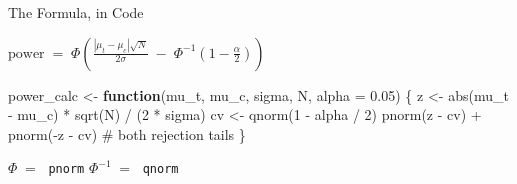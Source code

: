 \documentclass[
  ignorenonframetext,
  aspectratio=169,
]{beamer}
\newenvironment{Shaded}{\begin{snugshade}}{\end{snugshade}}
\newcommand{\AttributeTok}[1]{\textcolor[rgb]{0.40,0.45,0.13}{#1}}
\newcommand{\CommentTok}[1]{\textcolor[rgb]{0.37,0.37,0.37}{#1}}
\newcommand{\ControlFlowTok}[1]{\textcolor[rgb]{0.00,0.23,0.31}{\textbf{#1}}}
\newcommand{\DecValTok}[1]{\textcolor[rgb]{0.68,0.00,0.00}{#1}}
\newcommand{\FloatTok}[1]{\textcolor[rgb]{0.68,0.00,0.00}{#1}}
\newcommand{\FunctionTok}[1]{\textcolor[rgb]{0.28,0.35,0.67}{#1}}
\newcommand{\NormalTok}[1]{\textcolor[rgb]{0.00,0.23,0.31}{#1}}
\newcommand{\OtherTok}[1]{\textcolor[rgb]{0.00,0.23,0.31}{#1}}
\newcommand{\SpecialCharTok}[1]{\textcolor[rgb]{0.37,0.37,0.37}{#1}}
\begin{document}
\begin{frame}[fragile]{The Formula, in Code}
\label{the-formula-in-code}
\vspace{0.6em}

\begin{center}
$\displaystyle \text{power} \;=\; \Phi\!\left( \frac{|\mu_t - \mu_c|\sqrt{N}}{2\sigma} \;-\; \Phi^{-1}\!\left(1-\frac{\alpha}{2}\right) \right)$
\end{center}

\vspace{0.9em}

\begin{Shaded}
\begin{Highlighting}[]
\NormalTok{power\_calc }\OtherTok{\textless{}{-}} \ControlFlowTok{function}\NormalTok{(mu\_t, mu\_c, sigma, N, }\AttributeTok{alpha =} \FloatTok{0.05}\NormalTok{) \{}
\NormalTok{  z }\OtherTok{\textless{}{-}} \FunctionTok{abs}\NormalTok{(mu\_t }\SpecialCharTok{{-}}\NormalTok{ mu\_c) }\SpecialCharTok{*} \FunctionTok{sqrt}\NormalTok{(N) }\SpecialCharTok{/}\NormalTok{ (}\DecValTok{2} \SpecialCharTok{*}\NormalTok{ sigma)}
\NormalTok{  cv }\OtherTok{\textless{}{-}} \FunctionTok{qnorm}\NormalTok{(}\DecValTok{1} \SpecialCharTok{{-}}\NormalTok{ alpha }\SpecialCharTok{/} \DecValTok{2}\NormalTok{)}
  \FunctionTok{pnorm}\NormalTok{(z }\SpecialCharTok{{-}}\NormalTok{ cv) }\SpecialCharTok{+} \FunctionTok{pnorm}\NormalTok{(}\SpecialCharTok{{-}}\NormalTok{z }\SpecialCharTok{{-}}\NormalTok{ cv) }\CommentTok{\# both rejection tails}
\NormalTok{\}}
\end{Highlighting}
\end{Shaded}

\vspace{0.9em}

\begin{center}
\large $\Phi \;=\;$ \texttt{pnorm} \qquad\qquad $\Phi^{-1} \;=\;$ \texttt{qnorm}
\end{center}
\end{frame}
\end{document}
